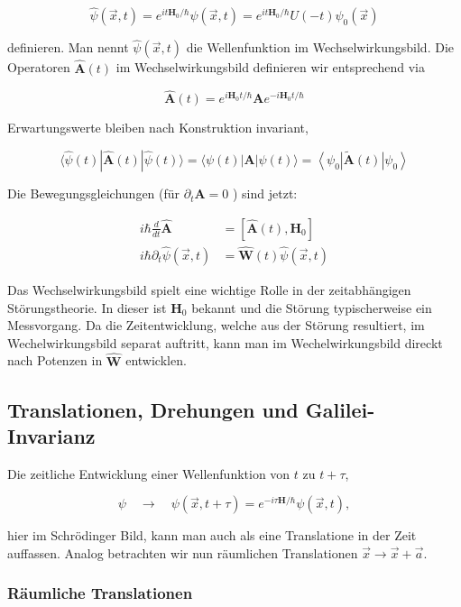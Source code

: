 \documentclass[10pt, letterpaper]{article}
\begin{document}
$$
\widehat{\psi}(\vec{x}, t)=e^{i t \mathbf{H}_{0} / \hbar} \psi(\vec{x}, t)=e^{i t \mathbf{H}_{0} / \hbar} U(-t) \psi_{0}(\vec{x})
$$

definieren. Man nennt $\widehat{\psi}(\vec{x}, t)$ die Wellenfunktion im Wechselwirkungsbild. Die Operatoren $\widehat{\mathbf{A}}(t)$ im Wechselwirkungsbild definieren wir entsprechend via

$$
\widehat{\mathbf{A}}(t)=e^{i \mathbf{H}_{0} t / \hbar} \mathbf{A} e^{-i \mathbf{H}_{0} t / \hbar}
$$

Erwartungswerte bleiben nach Konstruktion invariant,

$$
\langle\widehat{\psi}(t)| \widehat{\mathbf{A}}(t)|\widehat{\psi}(t)\rangle=\langle\psi(t)| \mathbf{A}|\psi(t)\rangle=\left\langle\psi_{0}\right| \tilde{\mathbf{A}}(t)\left|\psi_{0}\right\rangle
$$

Die Bewegungsgleichungen (für $\partial_{t} \mathbf{A}=0$ ) sind jetzt:

$$
\begin{aligned}
i \hbar \frac{d}{d t} \widehat{\mathbf{A}} & =\left[\widehat{\mathbf{A}}(t), \mathbf{H}_{0}\right] \\
i \hbar \partial_{t} \widehat{\psi}(\vec{x}, t) & =\widehat{\mathbf{W}}(t) \widehat{\psi}(\vec{x}, t)
\end{aligned}
$$

Das Wechselwirkungsbild spielt eine wichtige Rolle in der zeitabhängigen Störungstheorie. In dieser ist $\mathbf{H}_{0}$ bekannt und die Störung typischerweise ein Messvorgang. Da die Zeitentwicklung, welche aus der Störung resultiert, im Wechelwirkungsbild separat auftritt, kann man im Wechelwirkungsbild direckt nach Potenzen in $\widehat{\mathbf{W}}$ entwicklen.

\subsection*{Translationen, Drehungen und Galilei-Invarianz}
Die zeitliche Entwicklung einer Wellenfunktion von $t$ zu $t+\tau$,

$$
\psi \quad \rightarrow \quad \psi(\vec{x}, t+\tau)=e^{-i \tau \mathbf{H} / \hbar} \psi(\vec{x}, t),
$$

hier im Schrödinger Bild, kann man auch als eine Translatione in der Zeit auffassen. Analog betrachten wir nun räumlichen Translationen $\vec{x} \rightarrow \vec{x}+\vec{a}$.

\subsubsection*{Räumliche Translationen}
\end{document}
